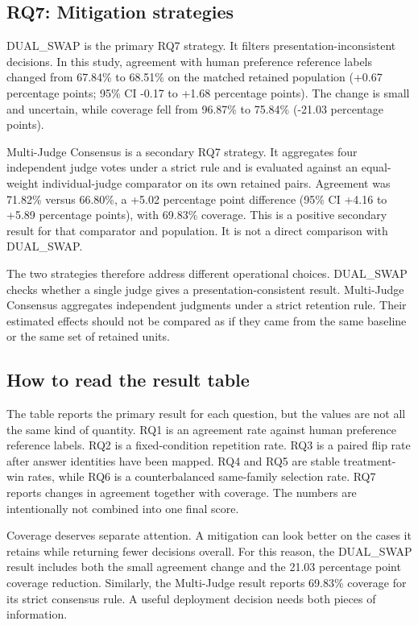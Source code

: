 \documentclass[11pt,a4paper]{article}
\begin{document}
\subsection*{RQ7: Mitigation strategies}

DUAL\_SWAP is the primary RQ7 strategy. It filters presentation-inconsistent decisions. In this study, agreement with human preference reference labels changed from 67.84\% to 68.51\% on the matched retained population (+0.67 percentage points; 95\% CI -0.17 to +1.68 percentage points). The change is small and uncertain, while coverage fell from 96.87\% to 75.84\% (-21.03 percentage points).

Multi-Judge Consensus is a secondary RQ7 strategy. It aggregates four independent judge votes under a strict rule and is evaluated against an equal-weight individual-judge comparator on its own retained pairs. Agreement was 71.82\% versus 66.80\%, a +5.02 percentage point difference (95\% CI +4.16 to +5.89 percentage points), with 69.83\% coverage. This is a positive secondary result for that comparator and population. It is not a direct comparison with DUAL\_SWAP.

The two strategies therefore address different operational choices. DUAL\_SWAP checks whether a single judge gives a presentation-consistent result. Multi-Judge Consensus aggregates independent judgments under a strict retention rule. Their estimated effects should not be compared as if they came from the same baseline or the same set of retained units.

\subsection*{How to read the result table}

The table reports the primary result for each question, but the values are not all the same kind of quantity. RQ1 is an agreement rate against human preference reference labels. RQ2 is a fixed-condition repetition rate. RQ3 is a paired flip rate after answer identities have been mapped. RQ4 and RQ5 are stable treatment-win rates, while RQ6 is a counterbalanced same-family selection rate. RQ7 reports changes in agreement together with coverage. The numbers are intentionally not combined into one final score.

Coverage deserves separate attention. A mitigation can look better on the cases it retains while returning fewer decisions overall. For this reason, the DUAL\_SWAP result includes both the small agreement change and the 21.03 percentage point coverage reduction. Similarly, the Multi-Judge result reports 69.83\% coverage for its strict consensus rule. A useful deployment decision needs both pieces of information.
\end{document}
